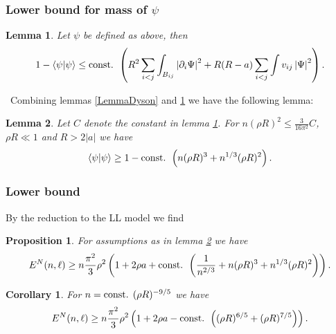 \documentclass{beamer}[10]
\newcommand{\abs}[1]{\left\lvert #1 \right\rvert}
\renewcommand{\braket}[1]{\left\langle#1\right\rangle}
\newtheorem{mproposition}{Proposition}
\newtheorem{mlemma}{Lemma}
\newtheorem{mcorollary}{Corollary}
\begin{document}
\begin{frame}
	\frametitle{Lower bound for mass of $ \psi $}
	\begin{block}{}\vspace{-0.5cm}
			\small\begin{mlemma}\label{LemmaNormLoss}
				Let $ \psi $ be defined as above, then \begin{equation}
				1-\braket{\psi|\psi}\leq\textnormal{const. } \left(R^2\sum_{i<j}\int_{B_{ij}}\abs{\partial_i \Psi}^2+R(R-a)\sum_{i<j}\int v_{ij} \abs{\Psi}^2\right).
				\end{equation}
			\end{mlemma}
			\
			Combining lemmas \ref{LemmaDyson} and \ref{LemmaNormLoss} we have the following lemma:
			\begin{mlemma}\label{LemmaImprovedMassBound}
				Let $ C $ denote the constant in lemma \ref{LemmaNormLoss}. For $ n(\rho R)^2\leq  \frac{3}{16\pi^2}C $, $ \rho R\ll 1 $ and $ R>2\abs{a} $ we have
				\begin{equation}\label{EqImprovedMassBound}
				\begin{aligned}
				\braket{\psi|\psi} \geq 1-\textnormal{const. }\left(n(\rho R)^3+n^{1/3}(\rho R)^2\right).
				\end{aligned}
				\end{equation}
			\end{mlemma}
	\end{block}	
\end{frame}

\begin{frame}
	\frametitle{Lower bound}
	\begin{block}{}
	\small	By the reduction to the LL model we find 
		\begin{mproposition}\label{PropositionLowerBoundSpecN}
			For assumptions as in lemma \ref{LemmaImprovedMassBound} we have \begin{equation}
			E^N(n,\ell)\geq n\frac{\pi^2}{3}\rho^2\left(1+2\rho a+\textnormal{const. }\left(\frac{1}{n^{2/3}}+n(\rho R)^3+n^{1/3}(\rho R)^2\right)\right).
			\end{equation}
		\end{mproposition}
		\begin{mcorollary} \label{CorollaryLowerBoundSpecN}
			For $ n=\textnormal{const. } (\rho R)^{-9/5} $ we have 
			\begin{equation}
			E^N(n,\ell)\geq n\frac{\pi^2}{3}\rho^2\left(1+2\rho a-\textnormal{const. }\left((\rho R)^{6/5}+(\rho R)^{7/5}\right)\right).
			\end{equation}
		\end{mcorollary}
	\end{block}	
\end{frame}
\end{document}
